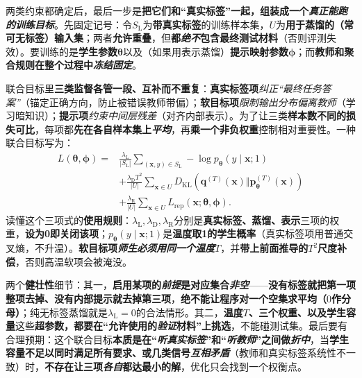 两类约束都确定后，最后一步是\textbf{把它们和“真实标签”一起，组装成一个\emph{真正能跑的训练目标}}。先固定记号：令$S_{\mathrm{L}}$为\textbf{带真实标签}的训练样本集，$U$为\textbf{用于蒸馏的（常可无标签）输入集}；两者\textbf{允许重叠}，但\textbf{都\emph{绝不}包含最终测试材料}（否则评测失效）。要训练的是\textbf{学生参数$\bm{\theta}$}以及（如果用表示蒸馏）\textbf{提示映射参数$\bm{\phi}$}；而\textbf{教师和聚合规则在整个过程中\emph{冻结固定}}。

联合目标里\textbf{三类监督各管一段、互补而不重复}：\textbf{真实标签项}\emph{纠正“最终任务答案”}（锚定正确方向，防止被错误教师带偏）；\textbf{软目标项}\emph{限制输出分布\emph{偏离}教师}（学习暗知识）；\textbf{提示项}\emph{约束中间层残差}（对齐内部表示）。为了让三类\textbf{样本数不同的损失可比}，每项都\textbf{先在各自样本集上\emph{平均}}，再\textbf{乘一个非负权重}控制相对重要性。一种联合目标写为：
\begin{equation}
  \begin{aligned}
    L(\bm{\theta},\bm{\phi})={}&
      \frac{\lambda_{\mathrm{L}}}{|S_{\mathrm{L}}|}
      \sum_{(\bm{x},y)\in S_{\mathrm{L}}}
        -\log p_{\bm{\theta}}(y\mid\bm{x};1)\\
      &+\frac{\lambda_{\mathrm{D}}T^2}{|U|}
      \sum_{\bm{x}\in U}
        D_{\mathrm{KL}}\!\left(
          \bm{q}^{(T)}(\bm{x})\Vert
          \bm{p}_{\bm{\theta}}^{(T)}(\bm{x})\right)\\
      &+\frac{\lambda_{\mathrm{R}}}{|U|}
      \sum_{\bm{x}\in U}L_{\mathrm{rep}}(\bm{x};\bm{\theta},\bm{\phi}).
  \end{aligned}
  \label{eq:ket-integration-joint-distillation}
\end{equation}
读懂这个三项式的\textbf{使用规则}：$\lambda_{\mathrm{L}},\lambda_{\mathrm{D}},\lambda_{\mathrm{R}}$分别是\textbf{真实标签、蒸馏、表示}三项的权重，\textbf{设为0即关闭该项}；$p_{\bm{\theta}}(y\mid\bm{x};1)$是\textbf{温度取1的学生概率}（真实标签项用普通交叉熵，不升温）。\textbf{软目标项\emph{师生必须用\emph{同一个}温度}$T$}，并\textbf{带上前面推导的$T^2$尺度补偿}，否则高温软项会被淹没。

两个\textbf{健壮性}细节：其一，\textbf{启用某项的\emph{前提}是对应集合\emph{非空}}——\textbf{没有标签就把第一项整项去掉、没有内部提示就去掉第三项}，\textbf{绝不能让程序对一个空集求平均（$0$作分母）}；纯无标签蒸馏就是$\lambda_{\mathrm{L}}=0$的合法情形。其二，\textbf{温度$T$、三个权重、以及学生容量}这些\textbf{超参数，都要在“允许使用的\emph{验证}材料”上挑选}，不能碰测试集。最后要有合理预期：这个联合目标\textbf{本质是在“\emph{听真实标签}”和“\emph{听教师}”之间做\emph{折中}}，当\textbf{学生容量不足以同时满足所有要求、或几类信号\emph{互相矛盾}}（教师和真实标签系统性不一致）时，\textbf{不存在让三项\emph{各自}都达最小的解}，优化只会找到一个权衡点。


